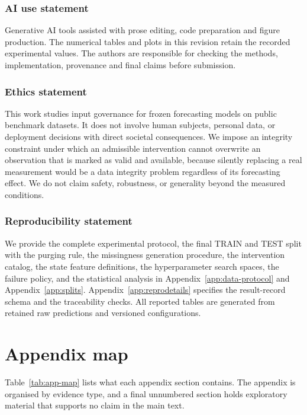 \documentclass{article}
\begin{document}
\subsubsection*{AI use statement}
Generative AI tools assisted with prose editing, code preparation and figure production.
The numerical tables and plots in this revision retain the recorded experimental values.
The authors are responsible for checking the methods, implementation, provenance and final
claims before submission.

\subsubsection*{Ethics statement}
This work studies input governance for frozen forecasting models on public benchmark datasets.
It does not involve human subjects, personal data, or deployment decisions with direct
societal consequences. We impose an integrity constraint under which an admissible
intervention cannot overwrite an observation that is marked as valid and available, because
silently replacing a real measurement would be a data integrity problem regardless of its
forecasting effect. We do not claim safety, robustness, or generality beyond the measured
conditions.

\subsubsection*{Reproducibility statement}
We provide the complete experimental protocol, the final TRAIN and TEST split with the
purging rule, the missingness generation procedure, the intervention catalog, the state
feature definitions, the hyperparameter search spaces, the failure policy, and the statistical
analysis in Appendix~\ref{app:data-protocol} and Appendix~\ref{app:splits}.
Appendix~\ref{app:reprodetails} specifies the result-record schema and the traceability checks.
All reported tables are generated from retained raw predictions and versioned configurations.




\appendix

\newpage

\section*{Appendix map}
\label{app:map}
Table~\ref{tab:app-map} lists what each appendix section contains. The appendix is organised
by evidence type, and a final unnumbered section holds
exploratory material that supports no claim in the main text.
\end{document}
